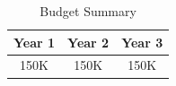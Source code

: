 \documentclass{article}
\begin{document}
\begin{table}[h]
\begin{center}
\caption{Budget Summary}
\label{table:budget}

\begin{tabular}{ c | c | c }
			
  \textbf{Year 1} & \textbf{Year 2} & \textbf{Year 3}  \\   \hline
  150K & 150K & 150K \\
   \end{tabular}
  \end{center}
\end{table}












































\end{document}
